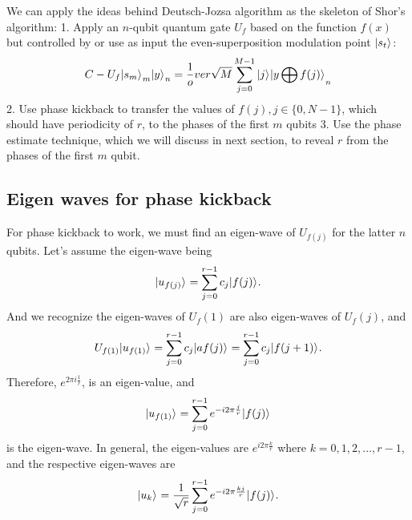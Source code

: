 \documentclass[oneside, letter, 12pt]{book}
\begin{document}
We can apply the ideas behind Deutsch-Jozsa algorithm as the skeleton of Shor's algorithm:
1. Apply an $n$-qubit quantum gate $U_f$ based on the function $f(x)$ but controlled by or use as input the even-superposition modulation point $\vert {s_t} \rangle_{}$:
\begin{equation}
    C-U_f{\vert {s_m} \rangle_{}}_m {\vert {y} \rangle_{}}_n = \frac 1 over \sqrt {M} \sum^{M-1}_{j=0} \vert {j} \rangle_{} {\vert {y\bigoplus f(j)} \rangle_{}}_n
\end{equation}
2. Use phase kickback to transfer the values of $f(j), j\in \{0,N-1\}$, which should have periodicity of $r$, to the phases of the first $m$ qubits
3. Use the phase estimate technique, which we will discuss in next section, to reveal $r$ from the phases of the first $m$ qubit.

\subsection{Eigen waves for phase kickback}
For phase kickback to work, we must find an eigen-wave of $U_{f(j)}$ for the latter $n$ qubits. Let's assume the eigen-wave being
\begin{equation}\label{keta_u}
    \vert {u_{f(j)}} \rangle_{} = \sum^{r-1}_{j=0} c_j \vert {f(j)} \rangle_{}.
\end{equation}
And we recognize the eigen-waves of $U_f(1)$ are also eigen-waves of $U_f(j)$, and
\begin{equation}\label{Uketa_u}
U_{f(1)} \vert {u_{f(1)}} \rangle_{} = \sum^{r-1}_{j=0} c_j \vert {a f(j)} \rangle_{}= \sum^{r-1}_{j=0} c_j \vert { f(j+1)} \rangle_{}.
\end{equation}
Therefore, $e^{2\pi i \frac 1 r}$, is an eigen-value, and
\begin{equation}\label{keta_u1}
    \vert {u_{f(1)}} \rangle_{} = \sum^{r-1}_{j=0} e^{-i 2\pi \frac j r} \vert {f(j)} \rangle_{}
\end{equation}
is the eigen-wave.
In general, the eigen-values are $e^{i 2\pi \frac k r}$ where $k=0, 1, 2, ..., r-1$, and the respective eigen-waves are
\begin{equation}\label{keta_uk}
    \vert {u_k} \rangle_{} = \frac 1 {\sqrt{r}} \sum^{r-1}_{j=0} e^{-i 2\pi \frac {kj} r} \vert {f(j)} \rangle_{}.
\end{equation}
\end{document}
